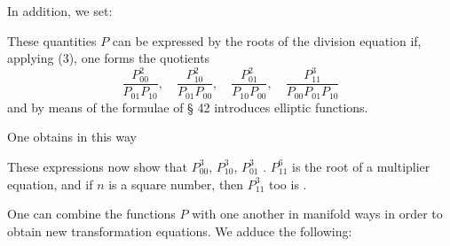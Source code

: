 In addition, we set:

These quantities $P$ can be expressed by the roots of the division equation if, applying (3), one forms the quotients
\[
\frac{P_{00}^2}{P_{01}P_{10}},\quad \frac{P_{10}^2}{P_{01}P_{00}},\quad \frac{P_{01}^2}{P_{10}P_{00}},\quad \frac{P_{11}^3}{P_{00}P_{01}P_{10}}
\]
and by means of the formulae of § 42 introduces elliptic functions.

One obtains in this way

These expressions now show that $P_{00}^3$, $P_{10}^3$, $P_{01}^3$ . $P_{11}^6$ is the root of a multiplier equation, and if $n$ is a square number, then $P_{11}^3$ too is .

One can combine the functions $P$ with one another in manifold ways in order to obtain new transformation equations. We adduce the following:
